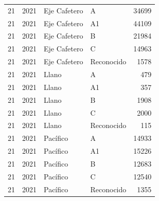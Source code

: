 \begin{longtable}{rrllr}
21 & 2021 & Eje Cafetero & A & 34699 \\
21 & 2021 & Eje Cafetero & A1 & 44109 \\
21 & 2021 & Eje Cafetero & B & 21984 \\
21 & 2021 & Eje Cafetero & C & 14963 \\
21 & 2021 & Eje Cafetero & Reconocido & 1578 \\
21 & 2021 & Llano & A & 479 \\
21 & 2021 & Llano & A1 & 357 \\
21 & 2021 & Llano & B & 1908 \\
21 & 2021 & Llano & C & 2000 \\
21 & 2021 & Llano & Reconocido & 115 \\
21 & 2021 & Pacífico & A & 14933 \\
21 & 2021 & Pacífico & A1 & 15226 \\
21 & 2021 & Pacífico & B & 12683 \\
21 & 2021 & Pacífico & C & 12540 \\
21 & 2021 & Pacífico & Reconocido & 1355 \\
\end{longtable}
